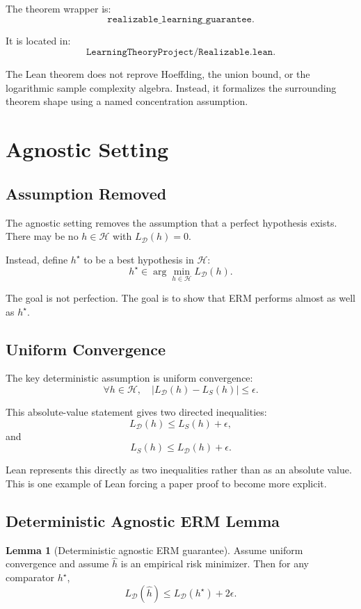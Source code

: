 \documentclass[11pt]{article}
\newcommand{\Hclass}{\mathcal{H}}
\newcommand{\Ddist}{\mathcal{D}}
\newcommand{\LD}{L_{\Ddist}}
\newcommand{\LS}{L_S}
\newcommand{\hh}{\widehat{h}}
\newcommand{\hstar}{h^\star}
\newcommand{\eps}{\epsilon}
\theoremstyle{definition}
\newtheorem{lemma}{Lemma}
\begin{document}
The theorem wrapper is:
\[
  \texttt{realizable\_learning\_guarantee}.
\]

It is located in:
\[
  \texttt{LearningTheoryProject/Realizable.lean}.
\]

The Lean theorem does not reprove Hoeffding, the union bound, or the logarithmic
sample complexity algebra. Instead, it formalizes the surrounding theorem shape
using a named concentration assumption.

\section{Agnostic Setting}

\subsection{Assumption Removed}

The agnostic setting removes the assumption that a perfect hypothesis exists.
There may be no $h\in\Hclass$ with $\LD(h)=0$.

Instead, define $\hstar$ to be a best hypothesis in $\Hclass$:
\[
  \hstar \in \arg\min_{h\in\Hclass}\LD(h).
\]

The goal is not perfection. The goal is to show that ERM performs almost as well
as $\hstar$.

\subsection{Uniform Convergence}

The key deterministic assumption is uniform convergence:
\[
  \forall h\in\Hclass,\quad |\LD(h)-\LS(h)|\le \eps.
\]

This absolute-value statement gives two directed inequalities:
\[
  \LD(h)\le \LS(h)+\eps,
\]
and
\[
  \LS(h)\le \LD(h)+\eps.
\]

Lean represents this directly as two inequalities rather than as an absolute
value. This is one example of Lean forcing a paper proof to become more
explicit.

\subsection{Deterministic Agnostic ERM Lemma}

\begin{lemma}[Deterministic agnostic ERM guarantee]
Assume uniform convergence and assume $\hh$ is an empirical risk minimizer. Then
for any comparator $\hstar$,
\[
  \LD(\hh)\le \LD(\hstar)+2\eps.
\]
\end{lemma}
\end{document}
